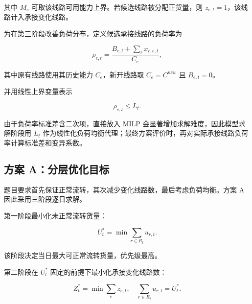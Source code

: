 \documentclass[UTF8,zihao=-4,a4paper,fontset=fandol]{ctexart}
\begin{document}
其中 $M_e$ 可取该线路可用能力上界。若候选线路被分配正货量，则 $z_{e,t}=1$，该线路计入承接变化线路。



为在第三阶段改善负荷分布，定义候选承接线路的负荷率为



\begin{equation}
\rho_{e,t}=\frac{B_{e,t}+\sum_r x_{r,e,t}}{C_e},
\end{equation}



其中原有线路使用其历史能力 $C_e$，新开线路取 $C_e=C^{new}$ 且 $B_{e,t}=0$。



并用线性上界变量表示



\begin{equation}
\rho_{e,t}\le L_t.
\end{equation}



由于负荷率标准差含二次项，直接放入 MILP 会显著增加求解难度，因此模型求解阶段用 $L_t$ 作为线性化负荷均衡代理；最终方案评价时，再对实际承接线路负荷率计算标准差和变异系数。



\subsection{方案 A：分层优化目标}



题目要求首先保证正常流转，其次减少变化线路数，最后考虑负荷均衡。方案 A 因此采用三阶段逐日求解。



第一阶段最小化未正常流转货量：



\begin{equation}
U_t^*=\min \sum_{r\in R_t}u_{r,t}.
\end{equation}



该阶段决定当日最大可正常流转货量，优先级最高。



第二阶段在 $U_t^*$ 固定的前提下最小化承接变化线路数：



\begin{equation}
Z_t^*=\min \sum_e z_{e,t},\quad \sum_{r\in R_t}u_{r,t}=U_t^*.
\end{equation}
\end{document}
